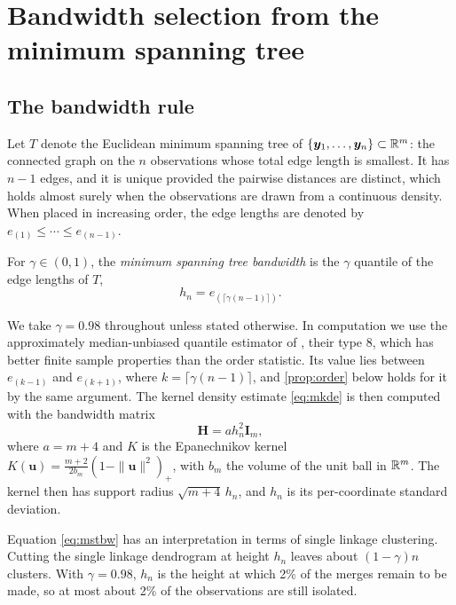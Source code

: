 \section{Bandwidth selection from the minimum spanning tree} \label{sec:mst}

\subsection{The bandwidth rule}

Let $T$ denote the Euclidean minimum spanning tree of $\{\bm{y}_1,\dots,\bm{y}_n\}\subset\mathbb{R}^m$: the connected graph on the $n$ observations whose total edge length is smallest. It has $n-1$ edges, and it is unique provided the pairwise distances are distinct, which holds almost surely when the observations are drawn from a continuous density. When placed in increasing order, the edge lengths are denoted by $e_{(1)} \le \cdots \le e_{(n-1)}$.

\begin{defn}\label{def:mstbw}
  For $\gamma\in(0,1)$, the \emph{minimum spanning tree bandwidth} is the $\gamma$ quantile of the edge lengths of $T$,
  \begin{equation}\label{eq:mstbw}
    h_n = e_{(\lceil \gamma(n-1)\rceil)}.
  \end{equation}
\end{defn}
We take $\gamma = 0.98$ throughout unless stated otherwise. In computation we use the approximately median-unbiased quantile estimator of \citet{HF96}, their type 8, which has better finite sample properties than the order statistic. Its value lies between $e_{(k-1)}$ and $e_{(k+1)}$, where $k=\lceil\gamma(n-1)\rceil$, and \cref{prop:order} below holds for it by the same argument. The kernel density estimate \eqref{eq:mkde} is then computed with the bandwidth matrix
\begin{equation}\label{eq:Hmst}
  \bm{H} = ah_n^2\bm{I}_m,
\end{equation}
where $a=m+4$ and $K$ is the Epanechnikov kernel $K(\bm{u})=\frac{m+2}{2b_m}(1-\|\bm{u}\|^2)_+$, with $b_m$ the volume of the unit ball in $\mathbb{R}^m$. The kernel then has support radius $\sqrt{m+4}\,h_n$, and $h_n$ is its per-coordinate standard deviation.

Equation \eqref{eq:mstbw} has an interpretation in terms of single linkage clustering. Cutting the single linkage dendrogram at height $h_n$ leaves about $(1-\gamma)n$ clusters. With $\gamma=0.98$, $h_n$ is the height at which 2\% of the merges remain to be made, so at most about 2\% of the observations are still isolated.

